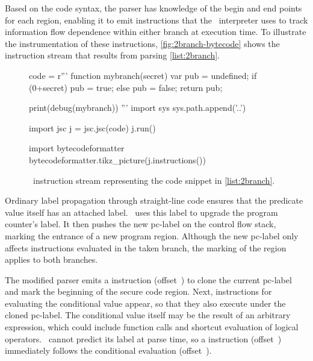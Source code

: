 Based on the code syntax, the parser has knowledge of the begin and end points for each region, enabling it to emit instructions that the \FlowCore\ interpreter uses to track information flow dependence within either branch at execution time.
To illustrate the instrumentation of these instructions, \autoref{fig:2branch-bytecode} shows the instruction stream that results from parsing \autoref{list:2branch}.

\begin{figure}[h]
\begin{python}
code = r'''
function mybranch(secret) {
  var pub = undefined;
  if (0+secret) {
    pub = true;
  } else {
    pub = false;
  }
  return pub;
}

print(debug(mybranch))
'''
import sys
sys.path.append('..')

import jsc
j = jsc.jsc(code)
j.run()

import bytecodeformatter
bytecodeformatter.tikz_picture(j.instructions())
\end{python}
  \caption{\FlowCore\ instruction stream representing the code snippet in \autoref{list:2branch}.}
  \label{fig:2branch-bytecode}
\end{figure}

Ordinary label propagation through straight-line code ensures that the predicate value itself has an attached label.
\FlowCore\ uses this label to upgrade the program counter's label.
It then pushes the new pc-label on the control flow stack, marking the entrance of a new program region.
Although the new pc-label only affects instructions evaluated in the taken branch, the marking of the region applies to both branches.

The modified parser emits a \dup instruction (offset~) to clone the current pc-label and mark the beginning of the secure code region.
Next, instructions for evaluating the conditional value appear, so that they also execute under the cloned pc-label.
The conditional value itself may be the result of an arbitrary expression, which could include function calls and shortcut evaluation of logical operators.
\FlowCore\ cannot predict its label at parse time, so a \join instruction (offset~) immediately follows the conditional evaluation (offset~).

